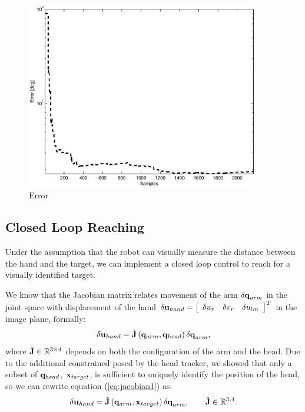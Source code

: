 \begin{figure}[tbp]
\label{fig:reaching-error}
\centerline{
\includegraphics[width=4.0in, angle=0 ]{./Figure/reachingError1.eps}
} \caption{Error} 
\end{figure}

\subsection{Closed Loop Reaching} \label{Eq:ClosedLoop}
%
Under the assumption that the robot can visually measure the distance
between the hand and the target, we can implement a closed loop 
control to reach for a visually identified target.

We know that the Jacobian matrix relates movement of the arm 
$\mathbf {\delta q}_{arm}$ in the joint space with displacement of the hand 
\begin{math}\mathbf {\delta u}_{hand}=
\left[ \begin{array}{ccc}
  \delta u_r & \delta v_r & \delta u_{lm}
\end{array} \right]^T\end{math} 
in the image plane, formally:
%
\begin{equation} 
\label{eq:jacobian1}
  \mathbf {\delta u}_{hand}=
  \tilde{\mathbf J}\left(\mathbf q_{arm}, \mathbf q_{head}\right)
  \mathbf {\delta q}_{arm},
\end{equation}
%
where $\tilde{\mathbf J} \in \mathbb R^{3 \times 4}$ depends on 
both the configuration of the arm and the head. Due to the 
additional constrained posed by the head tracker, we showed
that only a subset of $\mathbf{q}_{head}$, $\mathbf{x}_{target}$, is 
sufficient to uniquely identify the position of the head, so we 
can rewrite equation (\ref{eq:jacobian1}) as:
%
\begin{equation}
\label{eq:jacobian2}
  \mathbf {\delta u}_{hand}=
  \tilde{\mathbf J}\left(\mathbf q_{arm}, \mathbf{x}_{target}\right)
  \mathbf {\delta q}_{arm}, \qquad \tilde{\mathbf J} \in \mathbb R^{3,4}.
\end{equation}
%

